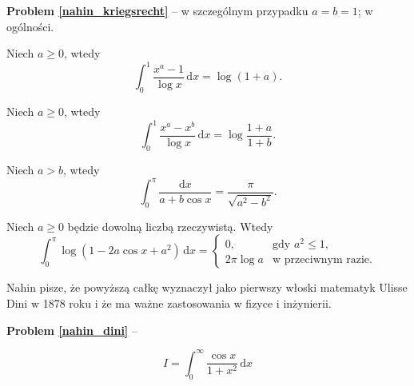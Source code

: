 \textbf{Problem \ref{nahin_kriegsrecht}} -- \cite[s. 67]{nahin15} w szczególnym przypadku $a = b = 1$; \cite[s. 114, 375]{nahin15} w ogólności.

\begin{problem}
    Niech $a \ge 0$, wtedy
    \begin{equation}
        \int_0^1 \frac{x^a - 1}{\log x} \,\mathrm{d}x = \log(1+a).
    \end{equation}
\end{problem}

\begin{problem}
    Niech $a \ge 0$, wtedy
    \begin{equation}
        \int_0^1 \frac{x^a - x^b}{\log x} \,\mathrm{d}x = \log \frac{1+a}{1+b}.
    \end{equation}
\end{problem}

\begin{problem}
    Niech $a > b$, wtedy
    \begin{equation}
        \int_0^\pi \frac{\mathrm{d}x} {a + b \cos x} = \frac{\pi}{\sqrt{a^2 - b^2}}.
    \end{equation}
\end{problem}

\begin{problem}
    \label{nahin_dini}%
    Niech $a \ge 0$ będzie dowolną liczbą rzeczywistą.
    Wtedy
    \begin{equation}
        \int_0^\pi \log (1 - 2 a \cos x + a^2) \,\mathrm{d} x = \begin{cases}
            0, & \text{gdy } a^2 \le 1, \\
            2 \pi \log a & \textrm{w przeciwnym razie}.
        \end{cases}
    \end{equation}
\end{problem}

Nahin pisze, że powyższą całkę wyznaczył jako pierwszy włoski matematyk Ulisse Dini w 1878 roku i że ma ważne zastosowania w fizyce i inżynierii.
%

\textbf{Problem \ref{nahin_dini}} -- \cite[s. 109-112]{nahin15}

\begin{equation}
    I = \int_0^\infty \frac {\cos x}{1+x^2} \,\mathrm{d}x
\end{equation}


